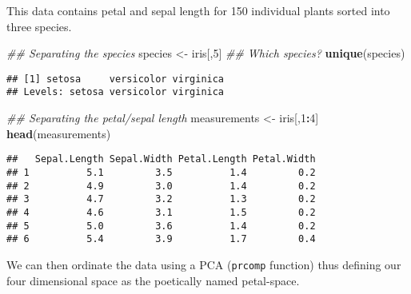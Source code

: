 \documentclass[
]{book}
\newenvironment{Shaded}{\begin{snugshade}}{\end{snugshade}}
\newcommand{\CommentTok}[1]{\textcolor[rgb]{0.56,0.35,0.01}{\textit{#1}}}
\newcommand{\DecValTok}[1]{\textcolor[rgb]{0.00,0.00,0.81}{#1}}
\newcommand{\KeywordTok}[1]{\textcolor[rgb]{0.13,0.29,0.53}{\textbf{#1}}}
\newcommand{\NormalTok}[1]{#1}
\newcommand{\OperatorTok}[1]{\textcolor[rgb]{0.81,0.36,0.00}{\textbf{#1}}}
\newcommand{\StringTok}[1]{\textcolor[rgb]{0.31,0.60,0.02}{#1}}
\begin{document}
This data contains petal and sepal length for 150 individual plants sorted into three species.

\begin{Shaded}
\begin{Highlighting}[]
\CommentTok{\#\# Separating the species}
\NormalTok{species \textless{}{-}}\StringTok{ }\NormalTok{iris[,}\DecValTok{5}\NormalTok{]}
\CommentTok{\#\# Which species?}
\KeywordTok{unique}\NormalTok{(species)}
\end{Highlighting}
\end{Shaded}

\begin{verbatim}
## [1] setosa     versicolor virginica 
## Levels: setosa versicolor virginica
\end{verbatim}

\begin{Shaded}
\begin{Highlighting}[]
\CommentTok{\#\# Separating the petal/sepal length}
\NormalTok{measurements \textless{}{-}}\StringTok{ }\NormalTok{iris[,}\DecValTok{1}\OperatorTok{:}\DecValTok{4}\NormalTok{]}
\KeywordTok{head}\NormalTok{(measurements)}
\end{Highlighting}
\end{Shaded}

\begin{verbatim}
##   Sepal.Length Sepal.Width Petal.Length Petal.Width
## 1          5.1         3.5          1.4         0.2
## 2          4.9         3.0          1.4         0.2
## 3          4.7         3.2          1.3         0.2
## 4          4.6         3.1          1.5         0.2
## 5          5.0         3.6          1.4         0.2
## 6          5.4         3.9          1.7         0.4
\end{verbatim}

We can then ordinate the data using a PCA (\texttt{prcomp} function) thus defining our four dimensional space as the poetically named petal-space.

\begin{Shaded}
\end{Shaded}
\end{document}
